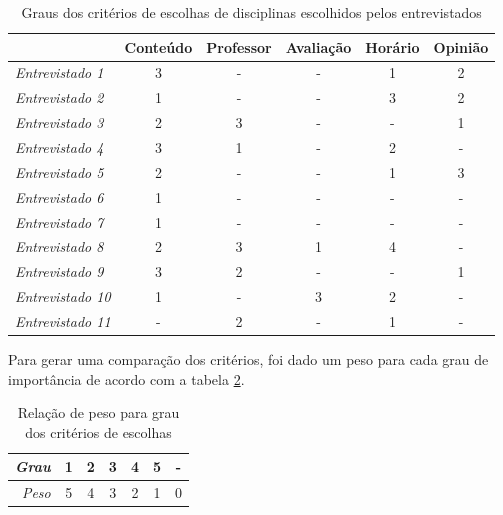 \begin{table}[!ht]
    \begin{center}
        \begin{tabular}{ l||c|c|c|c|c| } 
            & Conteúdo & Professor & Avaliação & Horário & Opinião \\ 
            \hline 
            \textit{Entrevistado 1 } & 3 & - & - & 1 & 2 \\     %
            \textit{Entrevistado 2 } & 1 & - & - & 3 & 2 \\     %
            \textit{Entrevistado 3 } & 2 & 3 & - & - & 1 \\     %
            \textit{Entrevistado 4 } & 3 & 1 & - & 2 & - \\     %
            \textit{Entrevistado 5 } & 2 & - & - & 1 & 3 \\     %
            \textit{Entrevistado 6 } & 1 & - & - & - & - \\     %
            \textit{Entrevistado 7 } & 1 & - & - & - & - \\     %
            \textit{Entrevistado 8 } & 2 & 3 & 1 & 4 & - \\     %
            \textit{Entrevistado 9 } & 3 & 2 & - & - & 1 \\     %
            \textit{Entrevistado 10} & 1 & - & 3 & 2 & - \\     %
            \textit{Entrevistado 11} & - & 2 & - & 1 & - \\     %
        \end{tabular}
    \end{center}
    \caption{Graus dos critérios de escolhas de disciplinas escolhidos pelos 
    entrevistados}
    
    \label{tab:entrevista-criterios-raw}
\end{table}

Para gerar uma comparação dos critérios, foi dado um peso para cada grau de importância de acordo com a tabela \ref{tab:grau-peso}.

\begin{table}[!ht]
    \begin{center}
        \begin{tabular}{ r||c|c|c|c|c|c| } 
            \textit{Grau} & 1 & 2 & 3 & 4 & 5 & - \\
            \hline 
            \textit{Peso} & 5 & 4 & 3 & 2 & 1 & 0 \\
        \end{tabular}
    \end{center}
    \caption{Relação de peso para grau dos critérios de escolhas}
    \label{tab:grau-peso}
\end{table}

